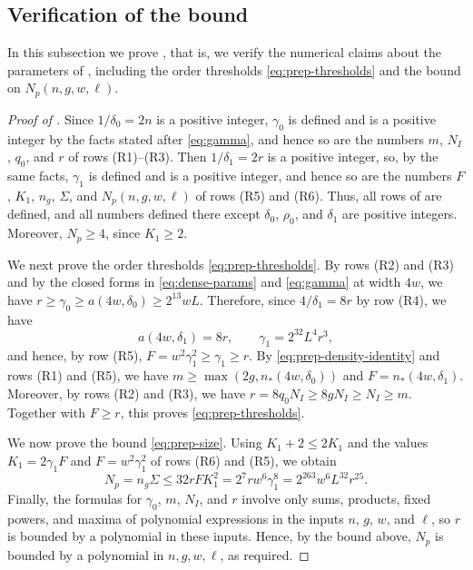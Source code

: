 \documentclass[fontsize=12pt,leading=14pt]{fullpaper}
\begin{document}
\subsection{Verification of the bound}\label{sec:prep-check}

In this subsection we prove , that is, we verify the numerical claims about the parameters of , including the order thresholds \eqref{eq:prep-thresholds} and the bound on $N_p(n,g,w,\ell)$.

\begin{proof}[Proof of ]
  Since $1/\delta_0=2n$ is a positive integer, $\gamma_0$ is defined and is a positive integer by the facts stated after \eqref{eq:gamma}, and hence so are the numbers $m$, $N_I$, $q_0$, and $r$ of rows (R1)--(R3).
  Then $1/\delta_1=2r$ is a positive integer, so, by the same facts, $\gamma_1$ is defined and is a positive integer, and hence so are the numbers $F$, $K_1$, $n_g$, $\Sigma$, and $N_p(n,g,w,\ell)$ of rows (R5) and (R6).
  Thus, all rows of  are defined, and all numbers defined there except $\delta_0$, $\rho_0$, and $\delta_1$ are positive integers.
  Moreover, $N_p\ge4$, since $K_1\ge2$.

  We next prove the order thresholds \eqref{eq:prep-thresholds}.
  By rows (R2) and (R3) and by the closed forms in \eqref{eq:dense-params} and \eqref{eq:gamma} at width $4w$, we have $r\ge\gamma_0\ge a(4w,\delta_0)\ge2^{13}wL$.
  Therefore, since $4/\delta_1=8r$ by row (R4), we have
  \[
    a(4w,\delta_1)=8r,\qquad \gamma_1=2^{32}L^4r^3,
  \]
  and hence, by row (R5), $F=w^2\gamma_1^2\ge\gamma_1\ge r$.
  By \eqref{eq:prep-density-identity} and rows (R1) and (R5), we have $m\ge\max(2g,n_*(4w,\delta_0))$ and $F=n_*(4w,\delta_1)$.
  Moreover, by rows (R2) and (R3), we have $r=8q_0N_I\ge8gN_I\ge N_I\ge m$.
  Together with $F\ge r$, this proves \eqref{eq:prep-thresholds}.

  We now prove the bound \eqref{eq:prep-size}.
  Using $K_1+2\le2K_1$ and the values $K_1=2\gamma_1F$ and $F=w^2\gamma_1^2$ of rows (R6) and (R5), we obtain
  \[
    N_p=n_g\Sigma\le32rFK_1^2
    =2^7rw^6\gamma_1^8
    =2^{263}w^6L^{32}r^{25}.
  \]
  Finally, the formulas for $\gamma_0$, $m$, $N_I$, and $r$ involve only sums, products, fixed powers, and maxima of polynomial expressions in the inputs $n$, $g$, $w$, and $\ell$, so $r$ is bounded by a polynomial in these inputs.
  Hence, by the bound above, $N_p$ is bounded by a polynomial in $n,g,w,\ell$, as required.
\end{proof}
\end{document}
